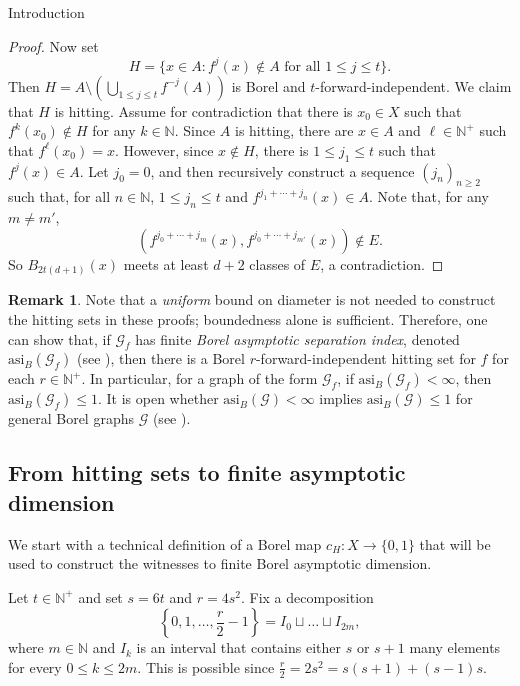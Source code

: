 \documentclass[psamsfonts]{amsart}
\theoremstyle{definition}
\newtheorem{remark}[thm]{Remark}
\newcommand{\N}{\mathbb N}
\newcommand{\asi}{\text{asi}}
\theoremstyle{remark}
\numberwithin{equation}{section}
\newcommand\mcal{\mathcal}
\begin{document}
\begin{section}{Introduction}
\begin{proof}
    Now set
    $$H = \{x \in A : f^j(x) \notin A \text{ for all $1 \leq j \leq t$} \}.$$
    Then $H = A \setminus (\bigcup_{1 \leq j \leq t} f^{-j}(A))$ is Borel and $t$-forward-independent.
    We claim that $H$ is hitting.
    Assume for contradiction that there is $x_0 \in X$ such that $f^k(x_0) \notin H$ for any $k \in \N$.
    Since $A$ is hitting, there are $x \in A$ and $\ell \in \N^+$ such that $f^{\ell}(x_0) = x$.
    However, since $x \notin H$, there is $1 \leq j_1 \leq t$ such that $f^j(x) \in A$. Let $j_0 = 0$, and then recursively construct a sequence $(j_n)_{n \geq 2}$ such that, for all $n \in \N$, $1 \leq j_n \leq t$ and $f^{j_1 + \cdots + j_n}(x) \in A$. Note that, for any $m \neq m'$, 
    $$(f^{j_0 + \cdots + j_m}(x), f^{j_0 + \cdots + j_{m'}}(x)) \notin E.$$
    So $B_{2t(d + 1)}(x)$ meets at least $d + 2$ classes of $E$, a contradiction.
\end{proof}

    \begin{remark}
        Note that a \emph{uniform} bound on diameter is not needed to construct the hitting sets in these proofs; boundedness alone is sufficient. Therefore, one can show that, if $\mcal{G}_f$ has finite \emph{Borel asymptotic separation index}, denoted $\asi_B(\mcal{G}_f)$ (see \cite[Definition~3.2]{cjmst2023}), then there is a Borel $r$-forward-independent hitting set for $f$ for each $r \in \N^+$. In particular, for a graph of the form $\mcal{G}_f$, if $\asi_B(\mcal{G}_f) < \infty$, then $\asi_B(\mcal{G}_f) \leq 1$. It is open whether $\asi_B(\mcal{G}) < \infty$ implies $\asi_B(\mcal{G}) \leq 1$ for general Borel graphs $\mcal{G}$ (see \cite{cjmst2023, qw2022,bw2023}).
    \end{remark}




\subsection{From hitting sets to finite asymptotic dimension}
\label{subsec:FIHAsdim}
    We start with a technical definition of a Borel map $c_H:X\to \{0,1\}$ that will be used to construct the witnesses to finite Borel asymptotic dimension.

    \medskip

    Let $t\in \N^+$ and set $s=6t$ and $r=4s^2$.
    Fix a decomposition
    \begin{equation}\label{eq:Decomp}
        \left\{0,1,\dots,\frac{r}{2}-1\right\}=I_0\sqcup \dots\sqcup I_{2m},
    \end{equation}
    where $m\in \N$ and $I_k$ is an interval that contains either $s$ or $s+1$ many elements for every $0\le k\le 2m$.
    This is possible since $\frac{r}{2}=2s^2=s(s+1)+(s-1)s$.
    

\end{section}
\end{document}
